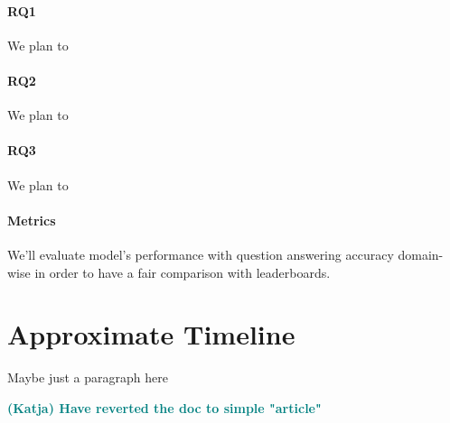 \documentclass[10pt]{article}
\newcommand{\katja}[1]{\textbf{\textcolor{teal}{(Katja) #1}}}
\begin{document}
\paragraph{RQ1} 
We plan to 

\paragraph{RQ2}
We plan to

\paragraph{RQ3}
We plan to

\paragraph{Metrics}
We'll evaluate model's performance with question answering accuracy domain-wise in order to have a fair comparison with leaderboards.

\section{Approximate Timeline}
Maybe just a paragraph here


\katja{Have reverted the doc to simple "article"}



\end{document}
